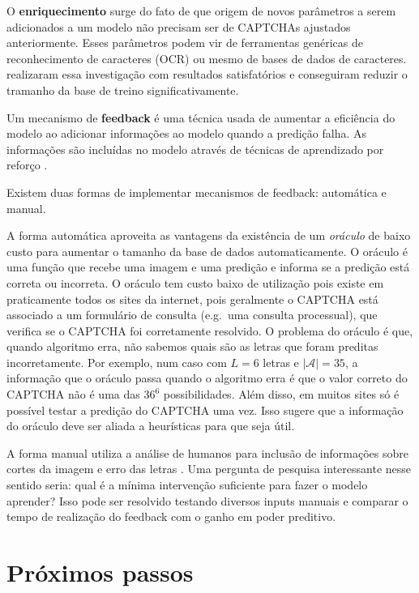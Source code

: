 \documentclass[12pt,]{report}
\begin{document}
O \textbf{enriquecimento} surge do fato de que origem de novos
parâmetros a serem adicionados a um modelo não precisam ser de CAPTCHAs
ajustados anteriormente. Esses parâmetros podem vir de ferramentas
genéricas de reconhecimento de caracteres (OCR) ou mesmo de bases de
dados de caracteres. \citet{george2017generative} realizaram essa
investigação com resultados satisfatórios e conseguiram reduzir o
tramanho da base de treino significativamente.

Um mecanismo de \textbf{feedback} é uma técnica usada de aumentar a
eficiência do modelo ao adicionar informações ao modelo quando a
predição falha. As informações são incluídas no modelo através de
técnicas de aprendizado por reforço \citep{sutton1998introduction}.

Existem duas formas de implementar mecanismos de feedback: automática e
manual.

A forma automática aproveita as vantagens da existência de um
\emph{oráculo} de baixo custo para aumentar o tamanho da base de dados
automaticamente. O oráculo é uma função que recebe uma imagem e uma
predição e informa se a predição está correta ou incorreta. O oráculo
tem custo baixo de utilização pois existe em praticamente todos os sites
da internet, pois geralmente o CAPTCHA está associado a um formulário de
consulta (e.g.~uma consulta processual), que verifica se o CAPTCHA foi
corretamente resolvido. O problema do oráculo é que, quando algoritmo
erra, não sabemos quais são as letras que foram preditas incorretamente.
Por exemplo, num caso com \(L=6\) letras e \(|\mathcal A|=35\), a
informação que o oráculo passa quando o algoritmo erra é que o valor
correto do CAPTCHA não é uma das \(36^6\) possibilidades. Além disso, em
muitos sites só é possível testar a predição do CAPTCHA uma vez. Isso
sugere que a informação do oráculo deve ser aliada a heurísticas para
que seja útil.

A forma manual utiliza a análise de humanos para inclusão de informações
sobre cortes da imagem e erro das letras \citep{bursztein2014end}. Uma
pergunta de pesquisa interessante nesse sentido seria: qual é a mínima
intervenção suficiente para fazer o modelo aprender? Isso pode ser
resolvido testando diversos inputs manuais e comparar o tempo de
realização do feedback com o ganho em poder preditivo.

\section{Próximos passos}\label{proximos-passos}
\end{document}
